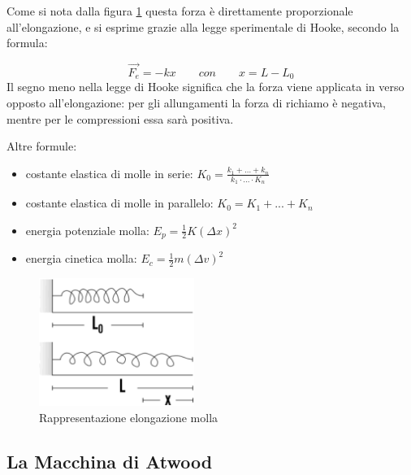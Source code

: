 Come si nota dalla figura \ref{img:molla} questa forza è direttamente proporzionale all'elongazione, e si esprime grazie alla legge sperimentale di Hooke, secondo la formula:

\begin{equation}
    \vec{F_e}  = -kx \qquad{con }\qquad x = L-L_0
    \label{ForzaElastica}
\end{equation}
Il segno meno nella legge di Hooke significa che la forza viene applicata in verso opposto all'elongazione: per gli allungamenti la forza di richiamo è negativa, mentre per le compressioni essa sarà positiva.

Altre formule:

\begin{itemize}
    \item costante elastica di molle in serie: $K_0 = \frac{k_1 +\dots{}+k_n}{k_1\cdot...\cdot K_n }$
    \item costante elastica di molle in parallelo: $K_0 = K_1+...+K_n$
    \item energia potenziale molla: $E_p = \frac{1}{2}K(\Delta x)^2$
    \item energia cinetica molla: $E_c = \frac{1}{2}m(\Delta v)^2$
\end{itemize}

\begin{figure}[H]%
\centering
\includegraphics[width=0.45\textwidth]{image/molla}
\caption[Rappresentazio molla]{Rappresentazione elongazione molla}
\label{img:molla}
\end{figure}




\subsection{La Macchina di Atwood}

